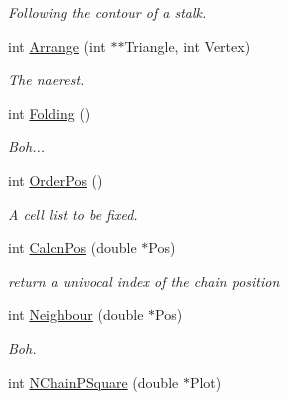 \begin{DoxyCompactItemize}
\begin{DoxyCompactList}\small\item\em \-Following the contour of a stalk. \end{DoxyCompactList}\item 
int \hyperlink{classVarData_a8d17011a714641fee1a20cceace47f4e}{\-Arrange} (int $\ast$$\ast$\-Triangle, int \-Vertex)
\begin{DoxyCompactList}\small\item\em \-The naerest. \end{DoxyCompactList}\item 
\hypertarget{classVarData_af9a9613864841dab614784ea1f9e5f16}{int \hyperlink{classVarData_af9a9613864841dab614784ea1f9e5f16}{\-Folding} ()}\label{classVarData_af9a9613864841dab614784ea1f9e5f16}

\begin{DoxyCompactList}\small\item\em \-Boh... \end{DoxyCompactList}\item 
\hypertarget{classVarData_a082d12c71897bca838b5eaad6deb3fae}{int \hyperlink{classVarData_a082d12c71897bca838b5eaad6deb3fae}{\-Order\-Pos} ()}\label{classVarData_a082d12c71897bca838b5eaad6deb3fae}

\begin{DoxyCompactList}\small\item\em \-A cell list to be fixed. \end{DoxyCompactList}\item 
\hypertarget{classVarData_a129e31bb544b71263ac43dda442b63c4}{int \hyperlink{classVarData_a129e31bb544b71263ac43dda442b63c4}{\-Calcn\-Pos} (double $\ast$\-Pos)}\label{classVarData_a129e31bb544b71263ac43dda442b63c4}

\begin{DoxyCompactList}\small\item\em return a univocal index of the chain position \end{DoxyCompactList}\item 
\hypertarget{classVarData_a933801832476dc21fcb11bf694c5d5d1}{int \hyperlink{classVarData_a933801832476dc21fcb11bf694c5d5d1}{\-Neighbour} (double $\ast$\-Pos)}\label{classVarData_a933801832476dc21fcb11bf694c5d5d1}

\begin{DoxyCompactList}\small\item\em \-Boh. \end{DoxyCompactList}\item 
\hypertarget{classVarData_a1d7407db719a858deae8f8b8b99bb0b7}{int \hyperlink{classVarData_a1d7407db719a858deae8f8b8b99bb0b7}{\-N\-Chain\-P\-Square} (double $\ast$\-Plot)}\label{classVarData_a1d7407db719a858deae8f8b8b99bb0b7}


\end{DoxyCompactItemize}

